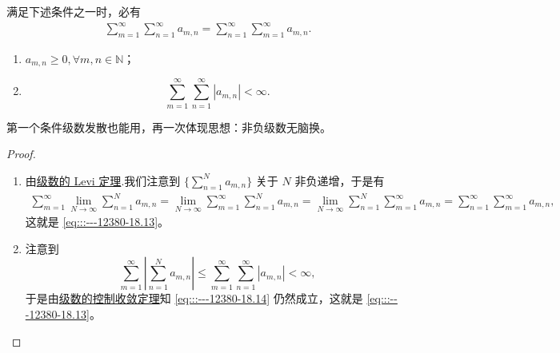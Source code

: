 \documentclass[../../main.tex]{subfiles}
\begin{document}
\begin{theorem}[级数的Fubini定理]\label{theorem:级数的Fubini定理}
满足下述条件之一时，必有
\begin{align}
\sum_{m = 1}^{\infty} \sum_{n = 1}^{\infty} a_{m,n} = \sum_{n = 1}^{\infty} \sum_{m = 1}^{\infty} a_{m,n}. \label{eq:::---12380-18.13}
\end{align}
\begin{enumerate}
\item \( a_{m,n} \geqslant 0, 
\forall m, n \in \mathbb{N} \)；

\item \[
\sum_{m = 1}^{\infty} \sum_{n = 1}^{\infty} |a_{m,n}| < \infty.
\]
\end{enumerate}
\end{theorem}
\begin{note}
第一个条件级数发散也能用，再一次体现思想：非负级数无脑换。
\end{note}
\begin{proof}
\begin{enumerate}
\item 由\hyperref[theorem:级数的Levi定理]{级数的 Levi 定理}.我们注意到 \( \{\sum_{n = 1}^{N} a_{m,n} \}\) 关于 \( N \) 非负递增，于是有
\begin{align}
\sum_{m = 1}^{\infty} \lim_{N \to \infty} \sum_{n = 1}^{N} a_{m,n} = \lim_{N \to \infty} \sum_{m = 1}^{\infty} \sum_{n = 1}^{N} a_{m,n} = \lim_{N \to \infty} \sum_{n = 1}^{N} \sum_{m = 1}^{\infty} a_{m,n} = \sum_{n = 1}^{\infty} \sum_{m = 1}^{\infty} a_{m,n}, \label{eq:::---12380-18.14}
\end{align}
这就是 \eqref{eq:::---12380-18.13}。

\item 注意到
\[
\sum_{m = 1}^{\infty} \left| \sum_{n = 1}^{N} a_{m,n} \right| \leqslant \sum_{m = 1}^{\infty} \sum_{n = 1}^{\infty} |a_{m,n}| < \infty,
\]
于是由\hyperref[theorem:级数的控制收敛定理]{级数的控制收敛定理}知 \eqref{eq:::---12380-18.14} 仍然成立，这就是 \eqref{eq:::---12380-18.13}。
\end{enumerate}
\end{proof}
\end{document}
